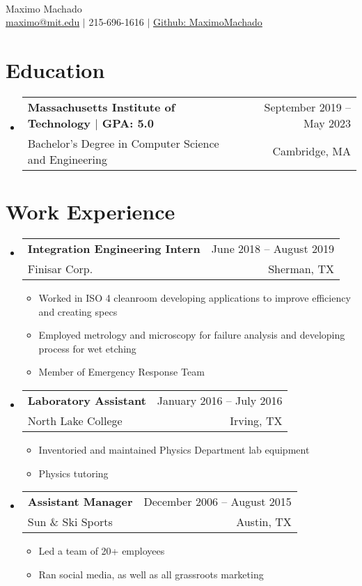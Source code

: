 \documentclass[letterpaper,11pt]{article} %
\makeatletter
\newcommand{\CVItem}[1]{
  \item\small{
    {#1 \vspace{-2pt}}
  }
}
\newcommand{\CVSubheading}[4]{
  \vspace{-2pt}\item
    \begin{tabular*}{0.97\textwidth}[t]{l@{\extracolsep{\fill}}r}
      \textbf{#1} & #2 \\
      \small#3 & \small #4 \\
    \end{tabular*}\vspace{-7pt}
}
\newcommand{\CVSubHeadingListStart}{\begin{itemize}[leftmargin=0.15in, label={}]} %
\newcommand{\CVSubHeadingListEnd}{\end{itemize}}
\newcommand{\CVItemListStart}{\begin{itemize}}
\newcommand{\CVItemListEnd}{\end{itemize}\vspace{-5pt}}
\makeatother
\begin{document}

\begin{minipage}[c]{0.05\textwidth}
  \-\
\end{minipage}

\begin{center}
  \Huge Maximo Machado \\ \vspace{1pt} %
  \small
  \href{mailto:maximo@mit.edu}{maximo@mit.edu} $|$
  215-696-1616 $|$
  \href{https://github.com/MaximoMachado}{Github: MaximoMachado}
\end{center}

\section{Education}
\CVSubHeadingListStart
\CVSubheading
{{Massachusetts Institute of Technology $|$ \small{GPA: 5.0}}}{September 2019 -- May 2023}
{Bachelor's Degree in Computer Science and Engineering}{Cambridge, MA}
\CVSubHeadingListEnd

\section{Work Experience}
\CVSubHeadingListStart
\CVSubheading
{Integration Engineering Intern}{June 2018 -- August 2019}
{Finisar Corp.}{Sherman, TX}
\CVItemListStart
\CVItem{Worked in ISO 4 cleanroom developing applications to improve efficiency and creating specs}
\CVItem{Employed metrology and microscopy for failure analysis and developing process for wet etching}
\CVItem{Member of Emergency Response Team}
\CVItemListEnd
\CVSubheading
{Laboratory Assistant}{January 2016 -- July 2016}
{North Lake College}{Irving, TX}
\CVItemListStart
\CVItem{Inventoried and maintained Physics Department lab equipment}
\CVItem{Physics tutoring}
\CVItemListEnd
\CVSubheading
{Assistant Manager}{December 2006 -- August 2015}
{Sun \& Ski Sports}{Austin, TX}
\CVItemListStart
\CVItem{Led a team of 20+ employees}
\CVItem{Ran social media, as well as all grassroots marketing}
\CVItemListEnd
\CVSubHeadingListEnd
\end{document}
